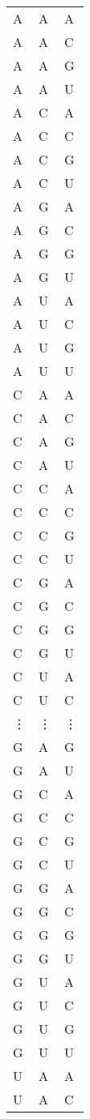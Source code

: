 \documentclass[11pt]{article}
\begin{document}
    \begin{tabular}{lll}
	 A & A & A\\
	 A & A & C\\
	 A & A & G\\
	 A & A & U\\
	 A & C & A\\
	 A & C & C\\
	 A & C & G\\
	 A & C & U\\
	 A & G & A\\
	 A & G & C\\
	 A & G & G\\
	 A & G & U\\
	 A & U & A\\
	 A & U & C\\
	 A & U & G\\
	 A & U & U\\
	 C & A & A\\
	 C & A & C\\
	 C & A & G\\
	 C & A & U\\
	 C & C & A\\
	 C & C & C\\
	 C & C & G\\
	 C & C & U\\
	 C & G & A\\
	 C & G & C\\
	 C & G & G\\
	 C & G & U\\
	 C & U & A\\
	 C & U & C\\
	 ⋮ & ⋮ & ⋮\\
	 G & A & G\\
	 G & A & U\\
	 G & C & A\\
	 G & C & C\\
	 G & C & G\\
	 G & C & U\\
	 G & G & A\\
	 G & G & C\\
	 G & G & G\\
	 G & G & U\\
	 G & U & A\\
	 G & U & C\\
	 G & U & G\\
	 G & U & U\\
	 U & A & A\\
	 U & A & C\\

\end{tabular}
\end{document}
